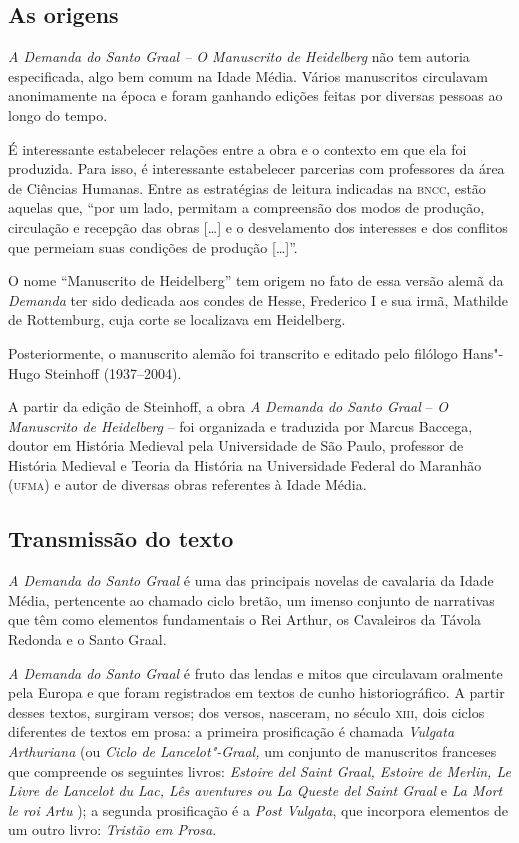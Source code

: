 \documentclass[11pt]{extarticle}
\begin{document}
\subsection{As origens}

\emph{A Demanda do Santo Graal -- O Manuscrito de Heidelberg} não tem
autoria especificada, algo bem comum na Idade Média. Vários manuscritos
circulavam anonimamente na época e foram ganhando edições feitas por
diversas pessoas ao longo do tempo.

É interessante estabelecer relações entre a obra e o contexto em que ela
foi produzida. Para isso, é interessante estabelecer parcerias com
professores da área de Ciências Humanas. Entre as estratégias de leitura
indicadas na \textsc{bncc}, estão aquelas que, ``por um lado, permitam a
compreensão dos modos de produção, circulação e recepção das obras
{[}\ldots{}{]} e o desvelamento dos interesses e dos conflitos que permeiam
suas condições de produção {[}\ldots{}{]}''.

O nome ``Manuscrito de Heidelberg'' tem origem no fato de essa versão
alemã da \emph{Demanda} ter sido dedicada aos condes de Hesse, Frederico
I e sua irmã, Mathilde de Rottemburg, cuja corte se localizava em
Heidelberg.

Posteriormente, o manuscrito alemão foi transcrito e editado pelo
filólogo Hans"-Hugo Steinhoff (1937--2004).

A partir da edição de Steinhoff, a obra \emph{A} \emph{Demanda do Santo
Graal} -- \emph{O Manuscrito de Heidelberg} -- foi organizada e
traduzida por Marcus Baccega, doutor em História Medieval pela
Universidade de São Paulo, professor de História Medieval e Teoria da
História na Universidade Federal do Maranhão (\textsc{ufma}) e autor de diversas
obras referentes à Idade Média.

\subsection{Transmissão do texto}

\emph{A Demanda do Santo Graal} é uma das
principais novelas de cavalaria da Idade Média, pertencente ao chamado
ciclo bretão, um imenso conjunto de narrativas que têm como elementos
fundamentais o Rei Arthur, os Cavaleiros da Távola Redonda e o Santo
Graal. 

\emph{A Demanda do Santo Graal} é fruto das lendas e mitos
que circulavam oralmente pela Europa e que foram registrados em textos
de cunho historiográfico. A partir desses textos, surgiram versos; dos
versos, nasceram, no século \textsc{xiii}, dois ciclos diferentes de textos em
prosa: a primeira prosificação é chamada \emph{Vulgata Arthuriana} (ou
\emph{Ciclo de Lancelot"-Graal,} um conjunto de manuscritos franceses que
compreende os seguintes livros: \emph{Estoire del Saint Graal, Estoire
de Merlin, Le Livre de Lancelot du Lac, Lês aventures ou La Queste del
Saint Graal} e \emph{La Mort le roi Artu} ); a segunda prosificação é a
\emph{Post Vulgata}, que incorpora elementos de um outro livro:
\emph{Tristão em Prosa}.
\end{document}
